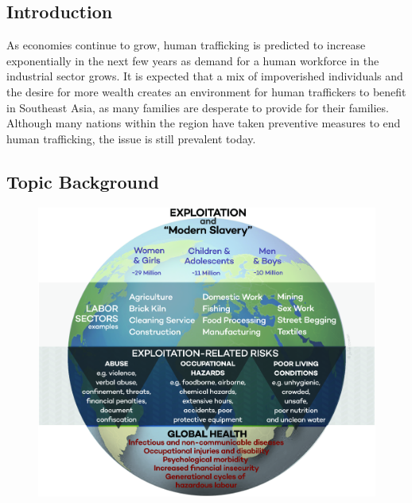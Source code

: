 \documentclass[10pt, letterpaper]{article}
\begin{document}
\subsection{Introduction}

As economies continue to grow, human trafficking is predicted to
increase exponentially in the next few years as demand for a human
workforce in the industrial sector grows. It is expected that a mix of
impoverished individuals and the desire for more wealth creates an
environment for human traffickers to benefit in Southeast Asia, as many
families are desperate to provide for their families. Although many
nations within the region have taken preventive measures to end human
trafficking, the issue is still prevalent today. \\

\subsection{Topic Background}

\begin{figure}
\centering
\includegraphics[scale = 0.075]{image4.png}
\end{figure}
\end{document}
